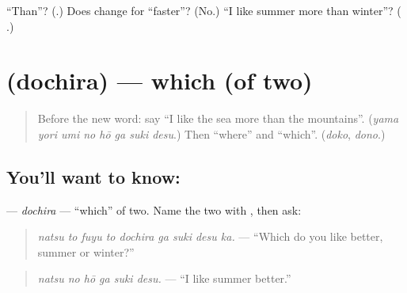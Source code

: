 \begin{tcolorbox}[breakable,colback=teal!4,colframe=teal!35!black,title={Before you move on}]
\textquotedblleft{}Than\textquotedblright{}? (\textbf{}.) Does \textbf{} change for \textquotedblleft{}faster\textquotedblright{}? (No.) \textquotedblleft{}I like summer more than winter\textquotedblright{}? (\textbf{   }.)
\end{tcolorbox}
\section[\texorpdfstring{\ja{どちら} (dochira)}{どちら (dochira)}]{ (dochira) — which (of two)}

\label{lesson:JA-C259-dochira}



\begin{quote}
Before the new word: say \textquotedblleft{}I like the sea more than the mountains\textquotedblright{}. (\emph{yama yori umi no hō ga suki desu}.) Then \textquotedblleft{}where\textquotedblright{} and \textquotedblleft{}which\textquotedblright{}. (\emph{doko}, \emph{dono}.)
\end{quote}

\subsection*{You'll want to know: }
\textbf{} — \emph{dochira} — \textquotedblleft{}which\textquotedblright{} of two. Name the two with \textbf{}, then ask:

\begin{quote}
\textbf{   }
\end{quote}

\begin{quote}
\emph{natsu to fuyu to dochira ga suki desu ka.} — \textquotedblleft{}Which do you like better, summer or winter?\textquotedblright{}
\end{quote}

\begin{quote}
\textbf{  }
\end{quote}

\begin{quote}
\emph{natsu no hō ga suki desu.} — \textquotedblleft{}I like summer better.\textquotedblright{}
\end{quote}

